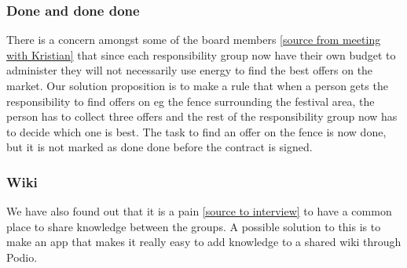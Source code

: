 \subsubsection{Done and done done}
There is a concern amongst some of the board members \ref{source from meeting
with Kristian} that since each responsibility group now have their own budget to
administer they will not necessarily use energy to find the best offers on the
market. Our solution proposition is to make a rule that when a person gets the
responsibility to find offers on eg the fence surrounding the festival area, the
person has to collect three offers and the rest of the responsibility group now
has to decide which one is best. The task to find an offer on the fence is now
done, but it is not marked as done done before the contract is signed.

\subsubsection{Wiki}
We have also found out that it is a pain \ref{source to interview} to have a
common place to share knowledge between the groups. A possible solution to this
is to make an app that makes it really easy to add knowledge to a shared wiki
through Podio.

